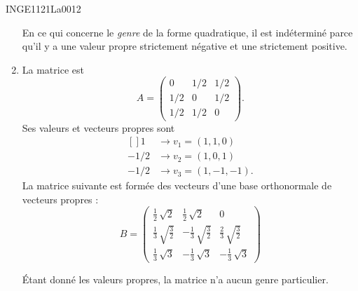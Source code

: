 \begin{corrige}{INGE1121La0012}
\begin{enumerate}
			En ce qui concerne le \emph{genre} de la forme quadratique, il est indéterminé parce qu'il y a une valeur propre strictement négative et une strictement positive.

	\item
		La matrice est
		\begin{equation}
			A=
			\begin{pmatrix}
				0	&	1/2	&	1/2	\\
				1/2	&	0	&	1/2	\\
				1/2	&	1/2	&	0
			\end{pmatrix}.
		\end{equation}
		Ses valeurs et vecteurs propres sont
		\begin{equation}
			\begin{aligned}[]
				1&\to v_1=(1, 1, 0)\\
				-1/2&\to v_2=(1, 0, 1)\\
				-1/2&\to v_3=(1, -1, -1).
			\end{aligned}
		\end{equation}
		La matrice suivante est formée des vecteurs d'une base orthonormale de vecteurs propres :
		\begin{equation}
			B=
			\begin{pmatrix}
				\frac{1}{2} \, \sqrt{2} & \frac{1}{2} \, \sqrt{2} & 0 \\
				\frac{1}{3} \, \sqrt{\frac{3}{2}} & -\frac{1}{3} \, \sqrt{\frac{3}{2}} & \frac{2}{3} \, \sqrt{\frac{3}{2}} \\
				\frac{1}{3} \, \sqrt{3} & -\frac{1}{3} \, \sqrt{3} & -\frac{1}{3} \, \sqrt{3}
			\end{pmatrix}
		\end{equation}

		Étant donné les valeurs propres, la matrice n'a aucun genre particulier.
		

	\end{enumerate}

\end{corrige}
